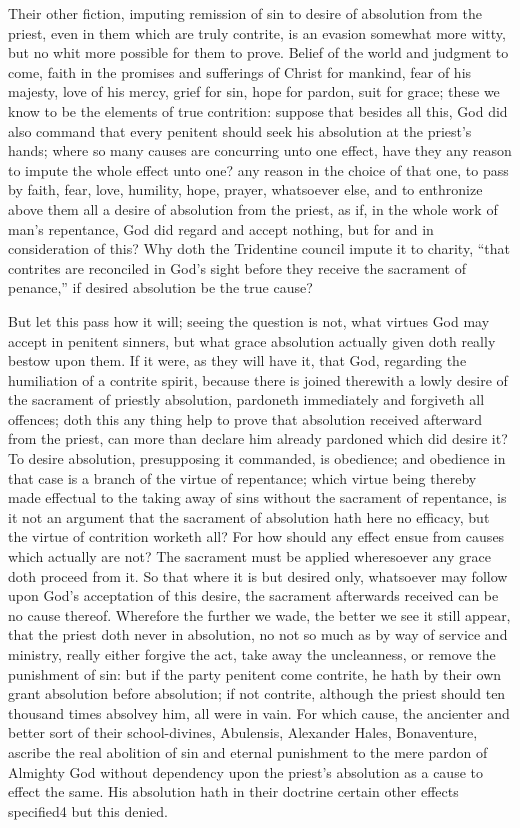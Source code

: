 Their other fiction, imputing remission of sin to desire of absolution from the priest, even in them which are truly contrite, is an evasion somewhat more witty, but no whit more possible for them to prove. Belief of the world and judgment to come, faith in the promises and sufferings of Christ for mankind, fear of his majesty, love of his mercy, grief for sin, hope for pardon, suit for grace; these we know to be the elements of true contrition: suppose that besides all this, God did also command that every penitent should seek his absolution at the priest’s hands; where so many causes are concurring unto one effect, have they any reason to impute the whole effect unto one? any reason in the choice of that one, to pass by faith, fear, love, humility, hope, prayer, whatsoever else, and to enthronize above them all a desire of absolution from the priest, as if, in the whole work of man’s repentance, God did regard and accept nothing, but for and in consideration of this? Why doth the Tridentine council impute it to charity, “that contrites are reconciled in God’s sight before they receive the sacrament of penance,” if desired absolution be the true cause?

But let this pass how it will; seeing the question is not, what virtues God may accept in penitent sinners, but what grace absolution actually given doth really bestow upon them. If it were, as they will have it, that God, regarding the humiliation of a contrite spirit, because there is joined therewith a lowly desire of the sacrament of priestly absolution, pardoneth immediately and forgiveth all offences; doth this any thing help to prove that absolution received afterward  from the priest, can more than declare him already pardoned which did desire it? To desire absolution, presupposing it commanded, is obedience; and obedience in that case is a branch of the virtue of repentance; which virtue being thereby made effectual to the taking away of sins without the sacrament of repentance, is it not an argument that the sacrament of absolution hath here no efficacy, but the virtue of contrition worketh all? For how should any effect ensue from causes which actually are not? The sacrament must be applied wheresoever any grace doth proceed from it. So that where it is but desired only, whatsoever may follow upon God’s acceptation of this desire, the sacrament afterwards received can be no cause thereof. Wherefore the further we wade, the better we see it still appear, that the priest doth never in absolution, no not so much as by way of service and ministry, really either forgive the act, take away the uncleanness, or remove the punishment of sin: but if the party penitent come contrite, he hath by their own grant absolution before absolution; if not contrite, although the priest should ten thousand times absolvey him, all were in vain. For which cause, the ancienter and better sort of their school-divines, Abulensis, Alexander Hales, Bonaventure, ascribe the real abolition of sin and eternal punishment to the mere pardon of Almighty God without dependency upon the priest’s absolution as a cause to effect the same. His absolution hath in their doctrine certain other effects specified4 but this denied.


